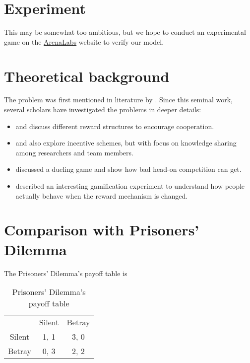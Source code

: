 \documentclass[11pt, a4paper]{article}
\begin{document}
\section{Experiment}
This may be somewhat too ambitious, but we hope to conduct an experimental game on the \href{http://arenalabs.co/}{ArenaLabs} website to verify our model.

\section{Theoretical background}
The problem was first mentioned in literature by \cite{Drago1991}. Since this seminal work, several scholars have investigated the problems in deeper details:
\begin{itemize}
	\item \cite{Drago1998} and \cite{Kistruck2016} discuss different reward structures to encourage cooperation.
	\item \cite{Banerjee2014} and \cite{Chakravarti2015} also explore incentive schemes, but with focus on knowledge sharing among researchers and team members.
	\item \cite{Immorlica2011} discussed a dueling game and show how bad head-on competition can get.
	\item \cite{Landers2015} described an interesting gamification experiment to understand how people actually behave when the reward mechanism is changed.
	
\end{itemize}
 
\section{Comparison with Prisoners' Dilemma}
The Prisoners' Dilemma's payoff table is 
\begin{table}[h]
	\centering
	\caption{Prisoners' Dilemma's payoff table}
	\begin{tabular}{c c c}
		        & Silent & Betray \\
		Silent  & 1, 1    & 3, 0     \\
		Betray  & 0, 3    & 2, 2
	\end{tabular}
\end{table}
\end{document}
